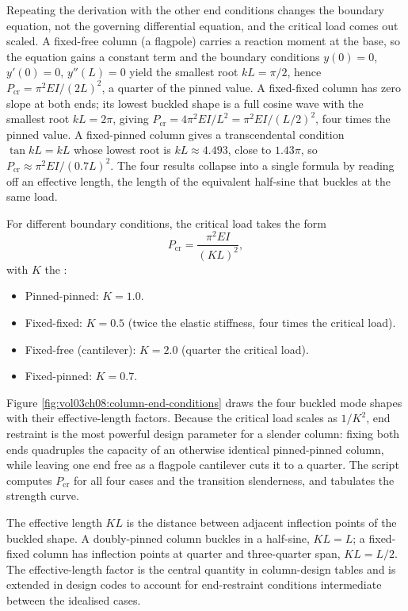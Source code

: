 Repeating the derivation with the other end conditions changes the
boundary equation, not the governing differential equation, and the
critical load comes out scaled. A fixed-free column (a flagpole) carries a
reaction moment at the base, so the equation gains a constant term and the
boundary conditions $y(0)=0$, $y'(0)=0$, $y''(L)=0$ yield the smallest
root $kL=\pi/2$, hence $P_{\text{cr}}=\pi^2 EI/(2L)^2$, a quarter of the
pinned value. A fixed-fixed column has zero slope at both ends; its lowest
buckled shape is a full cosine wave with the smallest root $kL=2\pi$,
giving $P_{\text{cr}}=4\pi^2 EI/L^2=\pi^2 EI/(L/2)^2$, four times the
pinned value. A fixed-pinned column gives a transcendental condition
$\tan kL=kL$ whose lowest root is $kL\approx 4.493$, close to
$1.43\pi$, so $P_{\text{cr}}\approx \pi^2 EI/(0.7L)^2$. The four results
collapse into a single formula by reading off an effective length, the
length of the equivalent half-sine that buckles at the same load.

For different boundary conditions, the critical load takes the form
\[
P_{\text{cr}} = \frac{\pi^2 EI}{(KL)^2},
\]
with $K$ the :

\begin{itemize}[leftmargin=*]
  \item Pinned-pinned: $K = 1.0$.
  \item Fixed-fixed: $K = 0.5$ (twice the elastic stiffness, four
    times the critical load).
  \item Fixed-free (cantilever): $K = 2.0$ (quarter the critical
    load).
  \item Fixed-pinned: $K = 0.7$.
\end{itemize}



Figure \ref{fig:vol03ch08:column-end-conditions} draws the four buckled
mode shapes with their effective-length factors. Because the critical
load scales as $1/K^2$, end restraint is the most powerful design
parameter for a slender column: fixing both ends quadruples the
capacity of an otherwise identical pinned-pinned column, while leaving
one end free as a flagpole cantilever cuts it to a quarter. The script
 computes $P_{\text{cr}}$ for all four
cases and the transition slenderness, and tabulates the strength curve.

The effective length $KL$ is the distance between adjacent inflection
points of the buckled shape. A doubly-pinned column buckles in a
half-sine, $KL = L$; a fixed-fixed column has inflection points at
quarter and three-quarter span, $KL = L/2$. The effective-length
factor is the central quantity in column-design tables and is
extended in design codes to account for end-restraint conditions
intermediate between the idealised cases.

